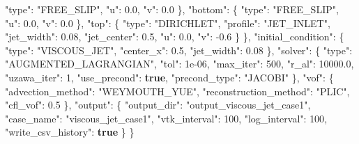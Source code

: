 \documentclass[
  10pt,
]{article}
\newenvironment{Shaded}{}{}
\newcommand{\DataTypeTok}[1]{\textcolor[rgb]{0.56,0.13,0.00}{#1}}
\newcommand{\DecValTok}[1]{\textcolor[rgb]{0.25,0.63,0.44}{#1}}
\newcommand{\FloatTok}[1]{\textcolor[rgb]{0.25,0.63,0.44}{#1}}
\newcommand{\FunctionTok}[1]{\textcolor[rgb]{0.02,0.16,0.49}{#1}}
\newcommand{\KeywordTok}[1]{\textcolor[rgb]{0.00,0.44,0.13}{\textbf{#1}}}
\newcommand{\StringTok}[1]{\textcolor[rgb]{0.25,0.44,0.63}{#1}}
\begin{document}
\begin{Shaded}
\begin{Highlighting}[]
      \DataTypeTok{"type"}\FunctionTok{:} \StringTok{"FREE\_SLIP"}\FunctionTok{,}
      \DataTypeTok{"u"}\FunctionTok{:} \FloatTok{0.0}\FunctionTok{,}
      \DataTypeTok{"v"}\FunctionTok{:} \FloatTok{0.0}
    \FunctionTok{\},}
    \DataTypeTok{"bottom"}\FunctionTok{:} \FunctionTok{\{}
      \DataTypeTok{"type"}\FunctionTok{:} \StringTok{"FREE\_SLIP"}\FunctionTok{,}
      \DataTypeTok{"u"}\FunctionTok{:} \FloatTok{0.0}\FunctionTok{,}
      \DataTypeTok{"v"}\FunctionTok{:} \FloatTok{0.0}
    \FunctionTok{\},}
    \DataTypeTok{"top"}\FunctionTok{:} \FunctionTok{\{}
      \DataTypeTok{"type"}\FunctionTok{:} \StringTok{"DIRICHLET"}\FunctionTok{,}
      \DataTypeTok{"profile"}\FunctionTok{:} \StringTok{"JET\_INLET"}\FunctionTok{,}
      \DataTypeTok{"jet\_width"}\FunctionTok{:} \FloatTok{0.08}\FunctionTok{,}
      \DataTypeTok{"jet\_center"}\FunctionTok{:} \FloatTok{0.5}\FunctionTok{,}
      \DataTypeTok{"u"}\FunctionTok{:} \FloatTok{0.0}\FunctionTok{,}
      \DataTypeTok{"v"}\FunctionTok{:} \FloatTok{{-}0.6}
    \FunctionTok{\}}
  \FunctionTok{\},}
  \DataTypeTok{"initial\_condition"}\FunctionTok{:} \FunctionTok{\{}
    \DataTypeTok{"type"}\FunctionTok{:} \StringTok{"VISCOUS\_JET"}\FunctionTok{,}
    \DataTypeTok{"center\_x"}\FunctionTok{:} \FloatTok{0.5}\FunctionTok{,}
    \DataTypeTok{"jet\_width"}\FunctionTok{:} \FloatTok{0.08}
  \FunctionTok{\},}
  \DataTypeTok{"solver"}\FunctionTok{:} \FunctionTok{\{}
    \DataTypeTok{"type"}\FunctionTok{:} \StringTok{"AUGMENTED\_LAGRANGIAN"}\FunctionTok{,}
    \DataTypeTok{"tol"}\FunctionTok{:} \DecValTok{1e{-}06}\FunctionTok{,}
    \DataTypeTok{"max\_iter"}\FunctionTok{:} \DecValTok{500}\FunctionTok{,}
    \DataTypeTok{"r\_al"}\FunctionTok{:} \FloatTok{10000.0}\FunctionTok{,}
    \DataTypeTok{"uzawa\_iter"}\FunctionTok{:} \DecValTok{1}\FunctionTok{,}
    \DataTypeTok{"use\_precond"}\FunctionTok{:} \KeywordTok{true}\FunctionTok{,}
    \DataTypeTok{"precond\_type"}\FunctionTok{:} \StringTok{"JACOBI"}
  \FunctionTok{\},}
  \DataTypeTok{"vof"}\FunctionTok{:} \FunctionTok{\{}
    \DataTypeTok{"advection\_method"}\FunctionTok{:} \StringTok{"WEYMOUTH\_YUE"}\FunctionTok{,}
    \DataTypeTok{"reconstruction\_method"}\FunctionTok{:} \StringTok{"PLIC"}\FunctionTok{,}
    \DataTypeTok{"cfl\_vof"}\FunctionTok{:} \FloatTok{0.5}
  \FunctionTok{\},}
  \DataTypeTok{"output"}\FunctionTok{:} \FunctionTok{\{}
    \DataTypeTok{"output\_dir"}\FunctionTok{:} \StringTok{"output\_viscous\_jet\_case1"}\FunctionTok{,}
    \DataTypeTok{"case\_name"}\FunctionTok{:} \StringTok{"viscous\_jet\_case1"}\FunctionTok{,}
    \DataTypeTok{"vtk\_interval"}\FunctionTok{:} \DecValTok{100}\FunctionTok{,}
    \DataTypeTok{"log\_interval"}\FunctionTok{:} \DecValTok{100}\FunctionTok{,}
    \DataTypeTok{"write\_csv\_history"}\FunctionTok{:} \KeywordTok{true}
  \FunctionTok{\}}
\FunctionTok{\}}
\end{Highlighting}
\end{Shaded}
\end{document}
